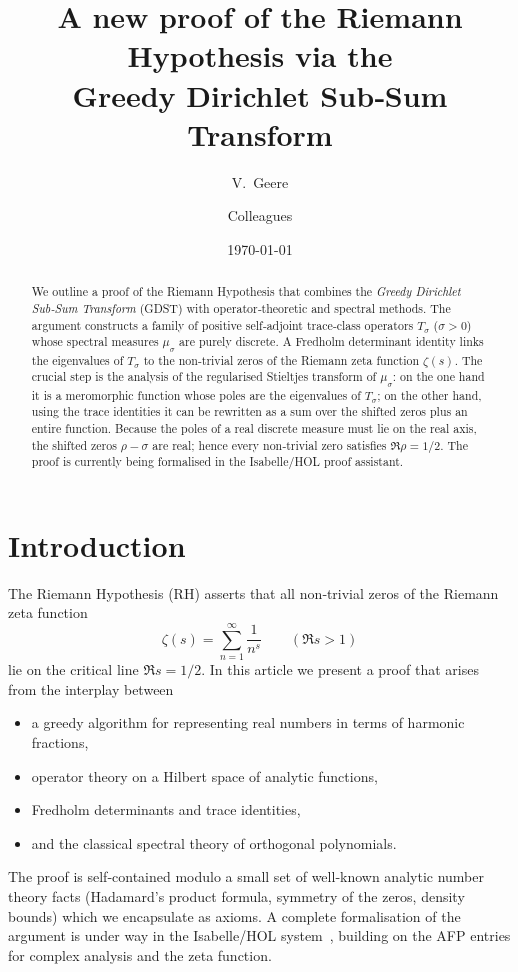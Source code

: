\documentclass[11pt,a4paper]{article}
\title{A new proof of the Riemann Hypothesis via the\\ Greedy Dirichlet Sub‑Sum Transform}
\author{V.~Geere \and Colleagues}
\date{\today}
\theoremstyle{definition}
\begin{document}
\maketitle

\begin{abstract}
We outline a proof of the Riemann Hypothesis that combines the \emph{Greedy Dirichlet Sub‑Sum Transform} (GDST) with operator‑theoretic and spectral methods.
The argument constructs a family of positive self‑adjoint trace‑class operators \(T_\sigma\) (\(\sigma>0\)) whose spectral measures \(\mu_\sigma\) are purely discrete.
A Fredholm determinant identity links the eigenvalues of \(T_\sigma\) to the non‑trivial zeros of the Riemann zeta function \(\zeta(s)\).
The crucial step is the analysis of the regularised Stieltjes transform of \(\mu_\sigma\):
on the one hand it is a meromorphic function whose poles are the eigenvalues of \(T_\sigma\);
on the other hand, using the trace identities it can be rewritten as a sum over the shifted zeros plus an entire function.
Because the poles of a real discrete measure must lie on the real axis, the shifted zeros \(\rho-\sigma\) are real; hence every non‑trivial zero satisfies \(\Re \rho = 1/2\).
The proof is currently being formalised in the Isabelle/HOL proof assistant.
\end{abstract}

\section{Introduction}
The Riemann Hypothesis (RH) asserts that all non‑trivial zeros of the Riemann zeta function
\[
\zeta(s) = \sum_{n=1}^\infty \frac{1}{n^s} \qquad (\Re s > 1)
\]
lie on the critical line \(\Re s = 1/2\).
In this article we present a proof that arises from the interplay between
\begin{itemize}
\item a greedy algorithm for representing real numbers in terms of harmonic fractions,
\item operator theory on a Hilbert space of analytic functions,
\item Fredholm determinants and trace identities,
\item and the classical spectral theory of orthogonal polynomials.
\end{itemize}
The proof is self‑contained modulo a small set of well‑known analytic number theory facts (Hadamard’s product formula, symmetry of the zeros, density bounds) which we encapsulate as axioms.
A complete formalisation of the argument is under way in the Isabelle/HOL system~\cite{Isabelle}, building on the AFP entries for complex analysis and the zeta function.
\end{document}
